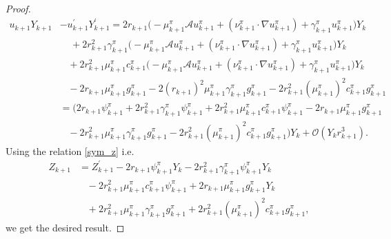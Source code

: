 \documentclass[10pt,a4paper]{amsart}
\begin{document}
\begin{proof}
\begin{align}
u_{k+1}Y_{k+1} &- u_{k+1}^{'}Y_{k+1}^{'} = 2r_{k+1}\Big(-\mu_{k+1}^{\pi}\mathcal{A}u_{k+1}^{\pi}+ (\nu_{k+1}^{\pi} \cdot \nabla u_{k+1}^{\pi}) + \gamma_{k+1}^{\pi}u_{k+1}^{\pi}\Big)Y_{k} 
\nonumber \\  &  \;\;\;\;  + 2r_{k+1}^{2}\gamma_{k+1}^{\pi}\Big(-\mu_{k+1}^{\pi}\mathcal{A}u_{k+1}^{\pi} + (\nu_{k+1}^{\pi}\cdot \nabla u_{k+1}^{\pi})  + \gamma_{k+1}^{\pi}u_{k+1}^{\pi}\Big)Y_{k} 
\nonumber  \\ & \;\;\; 
+ 2r_{k+1}^{2}\mu_{k+1}^{\pi}c_{k+1}^{\pi}\Big(- \mu_{k+1}^{\pi}\mathcal{A}u_{k+1}^{\pi} + (\nu_{k+1}^{\pi}\cdot \nabla u_{k+1}^{\pi}) + \gamma_{k+1}^{\pi}u_{k+1}^{\pi}\Big)Y_{k}  \nonumber \\ & \;\;\;  - 2r_{k+1}\mu_{k+1}^{\pi}g_{k+1}^{\pi} - 2(r_{k+1})^{2}\mu_{k+1}^{\pi}\gamma_{k+1}^{\pi}g_{k+1}^{\pi} - 2r_{k+1}^{2}(\mu_{k+1}^{\pi})^{2}c_{k+1}^{\pi}g_{k+1}^{\pi} \nonumber \\ & 
= \big(2r_{k+1}\psi_{k+1}^{\pi} + 2 r_{k+1}^{2}\gamma_{k+1}^{\pi} \psi_{k+1}^{\pi} + 2r_{k+1}^{2}\mu_{k+1}^{\pi}c_{k+1}^{\pi} \psi_{k+1}^{\pi} - 2r_{k+1}\mu_{k+1}^{\pi}g_{k+1}^{\pi} 
\nonumber 
\\ &  \;\;\; - 2r_{k+1}^{2}\mu_{k+1}^{\pi}\gamma_{k+1}^{\pi}g_{k+1}^{\pi} - 2r_{k+1}^{2}(\mu_{k+1}^{\pi})^{2}c_{k+1}^{\pi}g_{k+1}^{\pi}\big)Y_k + \mathcal{O}(Y_k r^{3}_{k+1}).
\end{align}
Using the relation \eqref{sym_z} i.e. 
\begin{align*}
    Z_{k+1} &= Z_{k+1}^{'} -   2r_{k+1}\psi^{\pi}_{k+1}Y_{k} - 2 r_{k+1}^{2}\gamma^{\pi}_{k+1} \psi^{\pi}_{k+1}Y_{k}
\nonumber \\& \;\;\;- 2r_{k+1}^{2}\mu^{\pi}_{k+1}c^{\pi}_{k+1} \psi^{\pi}_{k+1} + 2r_{k+1}\mu^{\pi}_{k+1}g^{\pi}_{k+1}Y_{k} 
\nonumber \\& \;\;\;+ 2r_{k+1}^2\mu^{\pi}_{k+1}\gamma^{\pi}_{k+1}g^{\pi}_{k+1}    +  2r_{k+1}^{2}(\mu^{\pi}_{k+1})^{2}c^{\pi}_{k+1}g^{\pi}_{k+1},
\end{align*}
we get the desired result. 
\end{proof}
\end{document}
